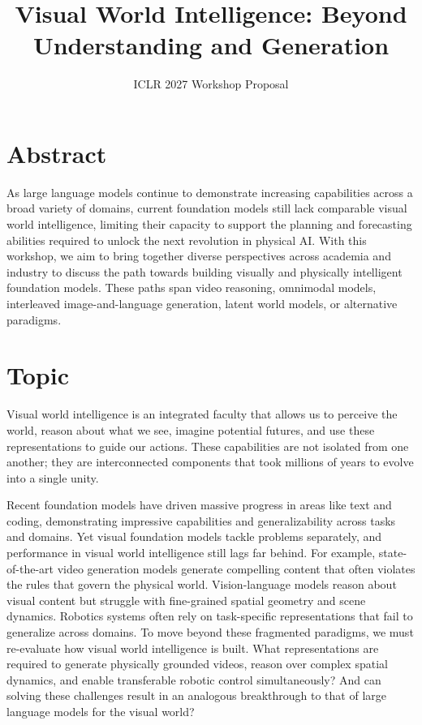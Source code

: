 \documentclass[11pt]{article}
\title{Visual World Intelligence: Beyond Understanding and Generation}
\author{ICLR 2027 Workshop Proposal}
\date{}
\begin{document}
\maketitle

\section{Abstract}

As large language models continue to demonstrate increasing capabilities across a broad variety of domains, current foundation models still lack comparable visual world intelligence, limiting their capacity to support the planning and forecasting abilities required to unlock the next revolution in physical AI. With this workshop, we aim to bring together diverse perspectives across academia and industry to discuss the path towards building visually and physically intelligent foundation models. These paths span video reasoning, omnimodal models, interleaved image-and-language generation, latent world models, or alternative paradigms.


\section{Topic}

Visual world intelligence is an integrated faculty that allows us to perceive the world, reason about what we see, imagine potential futures, and use these representations to guide our actions. These capabilities are not isolated from one another; they are interconnected components that took millions of years to evolve into a single unity.


Recent foundation models have driven massive progress in areas like text and coding, demonstrating impressive capabilities and generalizability across tasks and domains. Yet visual foundation models tackle problems separately, and performance in visual world intelligence still lags far behind. For example, state-of-the-art video generation models generate compelling content that often violates the rules that govern the physical world. Vision-language models reason about visual content but struggle with fine-grained spatial geometry and scene dynamics. Robotics systems often rely on task-specific representations that fail to generalize across domains. To move beyond these fragmented paradigms, we must re-evaluate how visual world intelligence is built. What representations are required to generate physically grounded videos, reason over complex spatial dynamics, and enable transferable robotic control simultaneously? And can solving these challenges result in an analogous breakthrough to that of large language models for the visual world?
\end{document}
